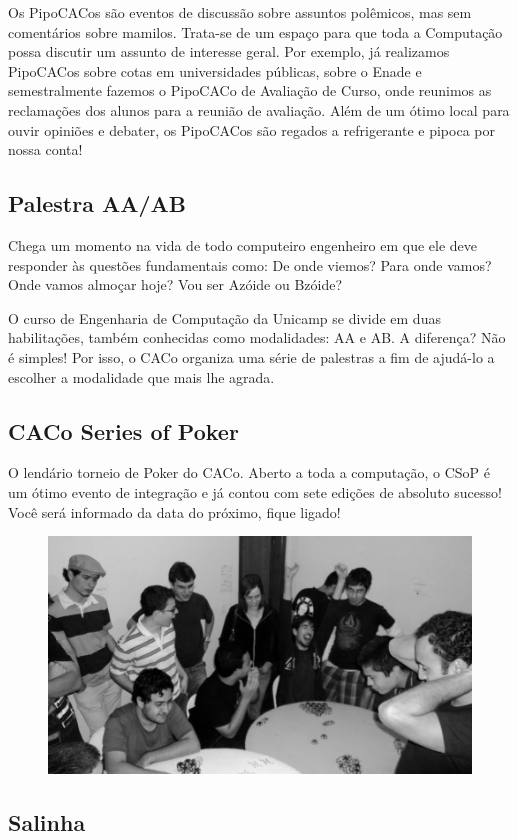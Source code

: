 Os PipoCACos são eventos de discussão sobre assuntos polêmicos, mas sem
comentários sobre  mamilos. Trata-se de um espaço para que toda a Computação
possa discutir um assunto de interesse geral. Por exemplo, já realizamos
PipoCACos sobre cotas em universidades públicas, sobre o Enade e semestralmente
fazemos o PipoCACo de Avaliação de Curso, onde reunimos as reclamações dos
alunos para a reunião de avaliação. Além de um ótimo local para ouvir opiniões e
debater, os PipoCACos são regados a refrigerante e pipoca por nossa conta!

\subsection{Palestra AA/AB}

Chega um momento na vida de todo computeiro engenheiro em que ele deve responder
às questões fundamentais como: De onde viemos? Para onde vamos? Onde vamos
almoçar hoje? Vou ser Azóide ou Bzóide?

O curso de Engenharia de Computação da Unicamp se divide em duas habilitações,
também conhecidas como modalidades: AA e AB. A diferença? Não é simples! Por
isso, o CACo organiza uma série de palestras a fim de ajudá-lo a escolher a
modalidade que mais lhe agrada.

\subsection{CACo Series of Poker}

O lendário torneio de Poker do CACo. Aberto a toda a computação, o CSoP é um
ótimo evento de integração e já contou com sete edições de absoluto sucesso!
Você será informado da data do próximo, fique ligado!

\begin{figure}[H]
    \centering
    \includegraphics[width=.45\textwidth]{img/alem_da_graduacao/caco_poker2.jpg}
\end{figure}

\subsection{Salinha}

